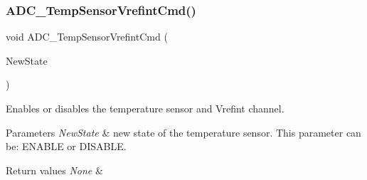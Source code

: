 \subsubsection{\texorpdfstring{ADC\_TempSensorVrefintCmd()}{ADC\_TempSensorVrefintCmd()}}
{\footnotesize\ttfamily void A\+D\+C\+\_\+\+Temp\+Sensor\+Vrefint\+Cmd (\begin{DoxyParamCaption}\item[{\mbox{\hyperlink{group___exported__types_gac9a7e9a35d2513ec15c3b537aaa4fba1}{Functional\+State}}}]{New\+State }\end{DoxyParamCaption})}



Enables or disables the temperature sensor and Vrefint channel. 


\begin{DoxyParams}{Parameters}
{\em New\+State} & new state of the temperature sensor. This parameter can be\+: E\+N\+A\+B\+LE or D\+I\+S\+A\+B\+LE. \\
\hline
\end{DoxyParams}

\begin{DoxyRetVals}{Return values}
{\em None} & \\
\hline
\end{DoxyRetVals}
